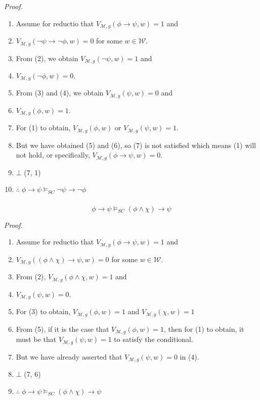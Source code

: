 \documentclass{article}
\begin{document}
            \textit{Proof.}
            \begin{enumerate}
                \item Assume for reductio that $V_{\mathscr{M}, g}(\phi \rightarrow \psi , w) = 1$ and
                \item $V_{\mathscr{M}, g}(\lnot \psi \rightarrow \lnot \phi, w) = 0$ for some $w \in \mathscr{W}$.
                \item From (2), we obtain $V_{\mathscr{M}, g}(\lnot \psi , w) = 1$ and 
                \item $V_{\mathscr{M}, g}(\lnot \phi, w) = 0$.
                \item From (3) and (4), we obtain $V_{\mathscr{M}, g}(\psi, w) = 0$ and
                \item $V_{\mathscr{M}, g}(\phi, w) = 1$.
                \item For (1) to obtain, $V_{\mathscr{M}, g}(\phi, w)$ or $V_{\mathscr{M}, g}(\psi, w) = 1$.
                \item But we have obtained (5) and (6), so (7) is not satisfied which means (1) will not hold, or specifically, $V_{\mathscr{M}, g}(\phi \rightarrow \psi, w) = 0$.
                \item $\bot$ (7, 1)
                \item $\therefore \; \phi \rightarrow \psi \vDash_{SC} \lnot \psi \rightarrow \lnot \phi$
            \end{enumerate}

            \subsubsection{}
            $$\phi \rightarrow \psi \vDash_{SC} (\phi \wedge \chi) \rightarrow \psi$$

            \textit{Proof.}
            \begin{enumerate}
                \item Assume for reductio that $V_{\mathscr{M}, g}(\phi \rightarrow \psi, w) = 1$ and
                \item $V_{\mathscr{M}, g}((\phi \wedge \chi) \rightarrow \psi, w) = 0$ for some $w \in \mathscr{W}$.
                \item From (2), $V_{\mathscr{M}, g}(\phi \wedge \chi, w) = 1$ and
                \item $V_{\mathscr{M}, g}(\psi, w) = 0$.
                \item For (3) to obtain, $V_{\mathscr{M}, g}(\phi, w) = 1$ and $V_{\mathscr{M}, g}(\chi, w) = 1$
                \item From (5), if it is the case that $V_{\mathscr{M}, g}(\phi, w) = 1$, then for (1) to obtain, it must be that $V_{\mathscr{M}, g}(\psi, w) = 1$ to satisfy the conditional.
                \item But we have already asserted that $V_{\mathscr{M}, g}(\psi, w) = 0$ in (4).
                \item $\bot$ (7, 6)
                \item $\therefore \; \phi \rightarrow \psi \vDash_{SC}(\phi \wedge \chi) \rightarrow \psi$
            \end{enumerate}
\end{document}
